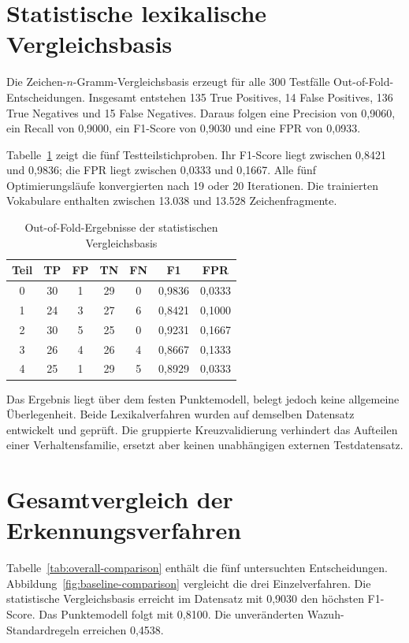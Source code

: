 \documentclass[12pt,a4paper,oneside,parskip=half]{scrreprt}
\begin{document}
\section{Statistische lexikalische Vergleichsbasis}
Die Zeichen-\(n\)-Gramm-Vergleichsbasis erzeugt für alle 300 Testfälle Out-of-Fold-Entscheidungen. Insgesamt entstehen 135 True Positives, 14 False Positives, 136 True Negatives und 15 False Negatives. Daraus folgen eine Precision von 0{,}9060, ein Recall von 0{,}9000, ein F1-Score von 0{,}9030 und eine FPR von 0{,}0933.

Tabelle~\ref{tab:baseline-folds} zeigt die fünf Testteilstichproben. Ihr F1-Score liegt zwischen 0{,}8421 und 0{,}9836; die FPR liegt zwischen 0{,}0333 und 0{,}1667. Alle fünf Optimierungsläufe konvergierten nach 19 oder 20 Iterationen. Die trainierten Vokabulare enthalten zwischen 13.038 und 13.528 Zeichenfragmente.

\begin{table}[H]
\centering
\caption[Out-of-Fold-Ergebnisse der statistischen Vergleichsbasis]{Out-of-Fold-Ergebnisse der statistischen Vergleichsbasis}
\label{tab:baseline-folds}
\small
\begin{tabular}{|c|c|c|c|c|c|c|}
\hline
\textbf{Teil} & \textbf{TP} & \textbf{FP} & \textbf{TN} & \textbf{FN} & \textbf{F1} & \textbf{FPR}\\
\hline
0 & 30 & 1 & 29 & 0 & 0{,}9836 & 0{,}0333\\
\hline
1 & 24 & 3 & 27 & 6 & 0{,}8421 & 0{,}1000\\
\hline
2 & 30 & 5 & 25 & 0 & 0{,}9231 & 0{,}1667\\
\hline
3 & 26 & 4 & 26 & 4 & 0{,}8667 & 0{,}1333\\
\hline
4 & 25 & 1 & 29 & 5 & 0{,}8929 & 0{,}0333\\
\hline
\end{tabular}
\end{table}

Das Ergebnis liegt über dem festen Punktemodell, belegt jedoch keine allgemeine Überlegenheit. Beide Lexikalverfahren wurden auf demselben Datensatz entwickelt und geprüft. Die gruppierte Kreuzvalidierung verhindert das Aufteilen einer Verhaltensfamilie, ersetzt aber keinen unabhängigen externen Testdatensatz.
\section{Gesamtvergleich der Erkennungsverfahren}
Tabelle~\ref{tab:overall-comparison} enthält die fünf untersuchten Entscheidungen. Abbildung~\ref{fig:baseline-comparison} vergleicht die drei Einzelverfahren. Die statistische Vergleichsbasis erreicht im Datensatz mit 0{,}9030 den höchsten F1-Score. Das Punktemodell folgt mit 0{,}8100. Die unveränderten Wazuh-Standardregeln erreichen 0{,}4538.
\end{document}
